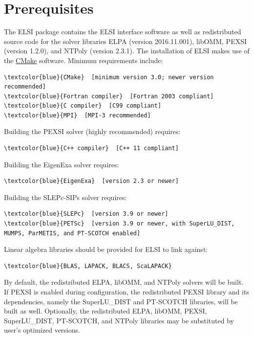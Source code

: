 \documentclass{report}
\begin{document}
\section{Prerequisites}
\label{sec:prereq}
The ELSI package contains the ELSI interface software as well as redistributed source code for the solver libraries ELPA (version 2016.11.001), libOMM, PEXSI (version 1.2.0), and NTPoly (version 2.3.1). The installation of ELSI makes use of the \href{http://cmake.org}{CMake} software. Minimum requirements include:
\begin{Verbatim}[commandchars=\\\{\}]
\textcolor{blue}{CMake}  [minimum version 3.0; newer version recommended]
\textcolor{blue}{Fortran compiler}  [Fortran 2003 compliant]
\textcolor{blue}{C compiler}  [C99 compliant]
\textcolor{blue}{MPI}  [MPI-3 recommended]
\end{Verbatim}

Building the PEXSI solver (highly recommended) requires:
\begin{Verbatim}[commandchars=\\\{\}]
\textcolor{blue}{C++ compiler}  [C++ 11 compliant]
\end{Verbatim}

Building the EigenExa solver requires:
\begin{Verbatim}[commandchars=\\\{\}]
\textcolor{blue}{EigenExa}  [version 2.3 or newer]
\end{Verbatim}

Building the SLEPc-SIPs solver requires:
\begin{Verbatim}[commandchars=\\\{\}]
\textcolor{blue}{SLEPc}  [version 3.9 or newer]
\textcolor{blue}{PETSc}  [version 3.9 or newer, with SuperLU_DIST, MUMPS, ParMETIS, and PT-SCOTCH enabled]
\end{Verbatim}

Linear algebra libraries should be provided for ELSI to link against:
\begin{Verbatim}[commandchars=\\\{\}]
\textcolor{blue}{BLAS, LAPACK, BLACS, ScaLAPACK}
\end{Verbatim}

By default, the redistributed ELPA, libOMM, and NTPoly solvers will be built. If PEXSI is enabled during configuration, the redistributed PEXSI library and its dependencies, namely the SuperLU\_DIST and PT-SCOTCH libraries, will be built as well. Optionally, the redistributed ELPA, libOMM, PEXSI, SuperLU\_DIST, PT-SCOTCH, and NTPoly libraries may be substituted by user's optimized versions.
\end{document}
